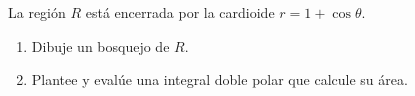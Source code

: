 La región $R$ está encerrada por la cardioide $r=1+\cos\theta$.
\begin{enumerate}
    \item Dibuje un bosquejo de $R$.
    \item Plantee y evalúe una integral doble polar que calcule su área.
\end{enumerate}
